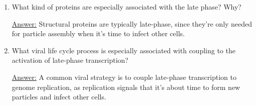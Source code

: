 \documentclass{article}
\newenvironment{QandA}{\begin{enumerate}[label=\bfseries Q\arabic*.]}
                       {\end{enumerate}}
\newenvironment{answered}{\par\normalfont\underline{Answer:}}{}
\begin{document}
\begin{QandA}
\begin{answered}
    \end{answered}
  \item{What kind of proteins are especially associated with the late phase? Why?}
    \begin{answered}
    Structural proteins are typically late-phase, since they're only needed for particle assembly when it's time to infect other cells.
    \end{answered}
  \item{What viral life cycle process is especially associated with coupling to the activation of late-phase transcription?}
    \begin{answered}
    A common viral strategy is to couple late-phase transcription to genome replication, as replication signals that it's about time to form new particles and infect other cells.
    \end{answered}
\end{QandA}
\end{document}
